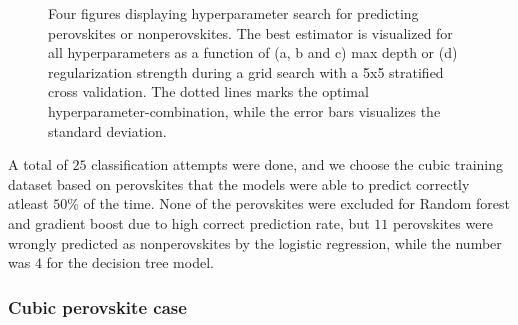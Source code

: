 \begin{figure}[!tbp]
  \begin{subfigure}[b]{0.5\textwidth}
    
    \caption{}
    \label{fig:per-LOG}
  \end{subfigure}%
  \hfill
  \begin{subfigure}[b]{0.5\textwidth}
    
    \caption{}
    \label{fig:per-DT}
  \end{subfigure}

  \begin{subfigure}[b]{0.5\textwidth}
    
    \caption{}
    \label{fig:per-RF}
  \end{subfigure}%
  \hfill
  \begin{subfigure}[b]{0.5\textwidth}
    
    \caption{}
    \label{fig:per-GB}
  \end{subfigure}
  \vspace*{-130mm}
  \caption{{Four figures displaying hyperparameter search for predicting perovskites or nonperovskites. The best estimator is visualized for all hyperparameters as a function of (a, b and c) max depth or (d) regularization strength during a grid search with a 5x5 stratified cross validation. The dotted lines marks the optimal hyperparameter-combination, while the error bars visualizes the standard deviation. }}
  \label{fig:perovskite-params}
\end{figure}

A total of $25$ classification attempts were done, and we choose the cubic training dataset based on perovskites that the models were able to predict correctly atleast $50\%$ of the time. None of the perovskites were excluded for Random forest and gradient boost due to high correct prediction rate, but $11$ perovskites were wrongly predicted as nonperovskites by the logistic regression, while the number was $4$ for the decision tree model.

\subsubsection{Cubic perovskite case}



